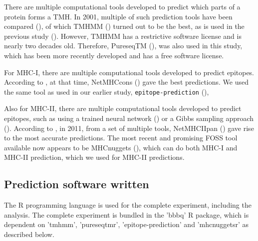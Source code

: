 There are multiple computational tools developed to predict which
parts of a protein forms a TMH.
In 2001, multiple of such prediction tools have been compared (\cite{moller2001evaluation}),
of which TMHMM (\cite{krogh2001predicting}) turned out to be the best, 
as is used in the previous study (\cite{bianchi2017}).
However, TMHMM has a restrictive software license and is nearly two
decades old.
Therefore, PureseqTM (\cite{wang2019efficient}),
was also used in this study, which has been more recently developed
and has a free software license.


For MHC-I, there are multiple computational tools developed 
to predict epitopes. 
According to \cite{lundegaard2011prediction}, at that time,
NetMHCcons (\cite{karosiene2012netmhccons}) gave the best predictions.
We used the same tool as used in our earlier study, \verb;epitope-prediction; (\cite{bianchi2017}),


Also for MHC-II, there are multiple computational tools developed 
to predict epitopes,
such as using a trained neural network (\cite{nielsen2003reliable})
or a Gibbs sampling approach (\cite{nielsen2004improved}).
According to \cite{lundegaard2011prediction}, in 2011,
from a set of multiple tools, 
NetMHCIIpan (\cite{nielsen2008quantitative,karosiene2013netmhciipan})
gave rise to the most accurate predictions.
The most recent and promising FOSS tool available now appears
to be MHCnuggets (\cite{shao2020high}), which can do both MHC-I 
and MHC-II prediction, which we used for MHC-II predictions.

\subsection{Prediction software written}

The R programming language is used for the complete 
experiment, including the analysis.
The complete experiment is bundled in the 'bbbq' R package,
which is dependent on 'tmhmm', 'pureseqtmr', 
'epitope-prediction' and 'mhcnuggetsr'
as described below.

